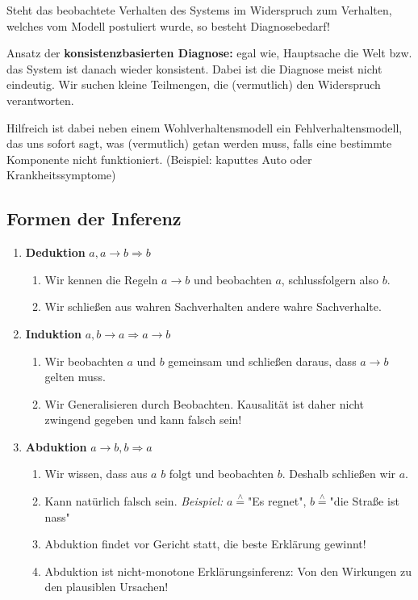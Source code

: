 \documentclass[runningheads,deutsch]{llncs}
\newcommand{\estimates}{\overset{\scriptscriptstyle\wedge}{=}}
\begin{document}
Steht das beobachtete Verhalten des Systems im Widerspruch zum Verhalten, welches vom Modell postuliert wurde, so besteht Diagnosebedarf!

Ansatz der \textbf{konsistenzbasierten Diagnose:} egal wie, Hauptsache die Welt bzw. das System ist danach wieder konsistent. Dabei ist die Diagnose meist nicht eindeutig. Wir suchen kleine Teilmengen, die (vermutlich) den Widerspruch verantworten.

Hilfreich ist dabei neben einem Wohlverhaltensmodell ein Fehlverhaltensmodell, das uns sofort sagt, was (vermutlich) getan werden muss, falls eine bestimmte Komponente nicht funktioniert. (Beispiel: kaputtes Auto oder Krankheitssymptome)

\subsection{Formen der Inferenz}

\begin{enumerate}
    \item \textbf{Deduktion} $a, a\rightarrow b \Rightarrow b$
    \begin{enumerate}
        \item Wir kennen die Regeln $a\rightarrow b$ und beobachten $a$, schlussfolgern also $b$.
        \item Wir schließen aus wahren Sachverhalten andere wahre Sachverhalte.
    \end{enumerate}
    \item \textbf{Induktion} $a, b\rightarrow a \Rightarrow a\rightarrow b$
    \begin{enumerate}
        \item Wir beobachten $a$ und $b$ gemeinsam und schließen daraus, dass $a\rightarrow b$ gelten muss.
        \item Wir Generalisieren durch Beobachten. Kausalität ist daher nicht zwingend gegeben und kann falsch sein!
    \end{enumerate}
    \item \textbf{Abduktion} $a \rightarrow b, b \Rightarrow a$
    \begin{enumerate}
        \item Wir wissen, dass aus $a$ $b$ folgt und beobachten $b$. Deshalb schließen wir $a$.
        \item Kann natürlich falsch sein. \textit{Beispiel:} $a\estimates$"Es regnet", $b\estimates$"die Straße ist nass"
        \item Abduktion findet vor Gericht statt, die beste Erklärung gewinnt!
        \item Abduktion ist nicht-monotone Erklärungsinferenz: Von den Wirkungen zu den plausiblen Ursachen!
    \end{enumerate}
\end{enumerate}
\end{document}
